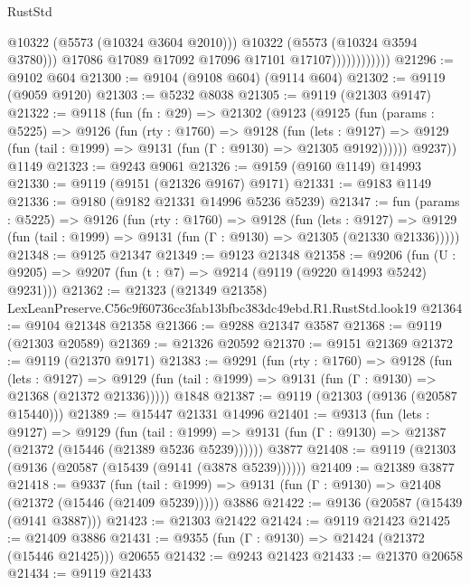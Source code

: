 \begin{lexlean}{RustStd}
\begin{coremodule}
                                @10322
                                (@5573 (@10324 @3604 @2010)))
                              @10322
                              (@5573 (@10324 @3594 @3780)))
                            @17086
                            @17089
                            @17092
                            @17096
                            @17101
                            @17107))))))))))))
@21296 := @9102 @604
@21300 := @9104 (@9108 @604) (@9114 @604)
@21302 := @9119 (@9059 @9120)
@21303 := @5232 @8038
@21305 := @9119 (@21303 @9147)
@21322 := @9118
    (fun (fn : @29) =>
    @21302
      (@9123
        (@9125
          (fun (params : @5225) =>
          @9126
            (fun (rty : @1760) =>
            @9128
              (fun (lets : @9127) =>
              @9129 (fun (tail : @1999) => @9131 (fun (Γ : @9130) => @21305 @9192))))))
        @9237))
    @1149
@21323 := @9243 @9061
@21326 := @9159 (@9160 @1149) @14993
@21330 := @9119 (@9151 (@21326 @9167) @9171)
@21331 := @9183 @1149
@21336 := @9180 (@9182 @21331 @14996 @5236 @5239)
@21347 := fun (params : @5225) =>
  @9126
    (fun (rty : @1760) =>
    @9128
      (fun (lets : @9127) =>
      @9129 (fun (tail : @1999) => @9131 (fun (Γ : @9130) => @21305 (@21330 @21336)))))
@21348 := @9125 @21347
@21349 := @9123 @21348
@21358 := @9206
    (fun (U : @9205) => @9207 (fun (t : @7) => @9214 (@9119 (@9220 @14993 @5242) @9231)))
@21362 := @21323 (@21349 @21358) LexLeanPreserve.C56c9f60736cc3fab13bfbc383dc49ebd.R1.RustStd.look19
@21364 := @9104 @21348 @21358
@21366 := @9288 @21347 @3587
@21368 := @9119 (@21303 @20589)
@21369 := @21326 @20592
@21370 := @9151 @21369
@21372 := @9119 (@21370 @9171)
@21383 := @9291
    (fun (rty : @1760) =>
    @9128
      (fun (lets : @9127) =>
      @9129 (fun (tail : @1999) => @9131 (fun (Γ : @9130) => @21368 (@21372 @21336)))))
    @1848
@21387 := @9119 (@21303 (@9136 (@20587 @15440)))
@21389 := @15447 @21331 @14996
@21401 := @9313
    (fun (lets : @9127) =>
    @9129
      (fun (tail : @1999) =>
      @9131 (fun (Γ : @9130) => @21387 (@21372 (@15446 (@21389 @5236 @5239))))))
    @3877
@21408 := @9119 (@21303 (@9136 (@20587 (@15439 (@9141 (@3878 @5239))))))
@21409 := @21389 @3877
@21418 := @9337
    (fun (tail : @1999) => @9131 (fun (Γ : @9130) => @21408 (@21372 (@15446 (@21409 @5239)))))
    @3886
@21422 := @9136 (@20587 (@15439 (@9141 @3887)))
@21423 := @21303 @21422
@21424 := @9119 @21423
@21425 := @21409 @3886
@21431 := @9355 (fun (Γ : @9130) => @21424 (@21372 (@15446 @21425))) @20655
@21432 := @9243 @21423
@21433 := @21370 @20658
@21434 := @9119 @21433

\end{coremodule}
\end{lexlean}
